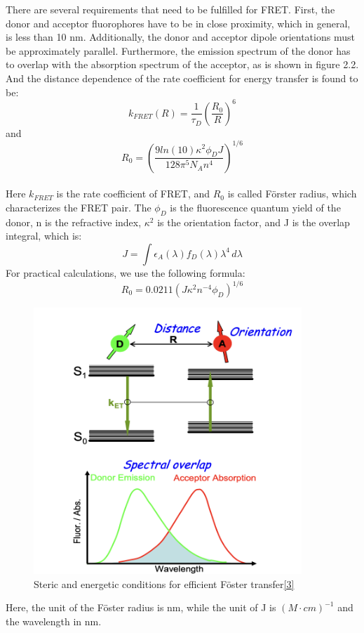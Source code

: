 \documentclass[a4paper,english,12pt,bibliography=totoc]{scrreprt}
\begin{document}
There are several requirements that need to be fulfilled for FRET. First, the donor and acceptor fluorophores have to be in close proximity, which in general, is less than 10 nm. Additionally, the donor and acceptor dipole orientations must be approximately parallel. Furthermore, the emission spectrum of the donor has to overlap with the absorption spectrum of the acceptor, as is shown in figure 2.2. And the distance dependence of the rate coefficient for energy transfer is found to be:
\[
k_{FRET}(R) = \frac{1}{\tau_D}(\frac{R_0}{R})^6
\]
and
\[
R_0 = (\frac{9ln(10)\kappa^2\phi_DJ}{128\pi^5N_An^4})^{1/6}
\]
\\
Here $k_{FRET}$ is the rate coefficient of FRET, and $R_0$ is called Förster radius, which characterizes the FRET pair. The $\phi_D$ is the fluorescence quantum yield of the donor, n is the refractive index, $\kappa^2$ is the orientation factor, and J is the overlap integral, which is:
\[
J = \int \epsilon_A(\lambda)f_D(\lambda){\lambda}^4\, d\lambda
\]
For practical calculations, we use the following formula:
\[
R_0 = 0.0211(J\kappa^2n^{-4}\phi_D)^{1/6}
\]
\begin{figure}[H]
        \centering
        \includegraphics[width=0.9\textwidth]{images/other/FRET.png}
	    \caption{Steric and energetic conditions for efficient Föster transfer\hyperref[sec:ref_3]{[3]}}
\end{figure}

Here, the unit of the Föster radius is nm, while the unit of J is $(M \cdot cm)^{-1}$ and the wavelength in nm.\\
\end{document}

